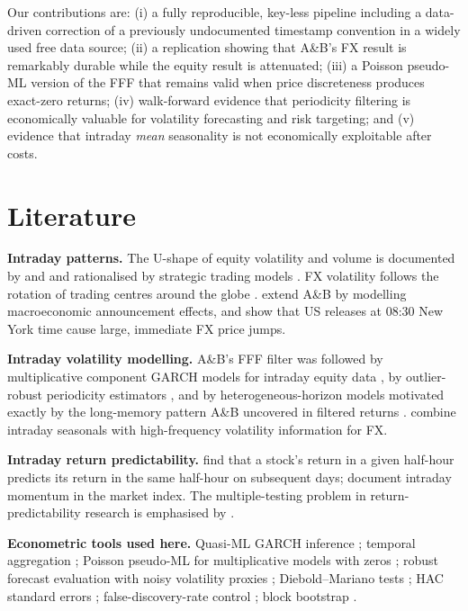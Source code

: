 \documentclass[11pt,a4paper]{article}
\begin{document}
Our contributions are: (i) a fully reproducible, key-less pipeline including a data-driven correction of a previously undocumented timestamp convention in a widely used free data source; (ii) a replication showing that A\&B's FX result is remarkably durable while the equity result is attenuated; (iii) a Poisson pseudo-ML version of the FFF that remains valid when price discreteness produces exact-zero returns; (iv) walk-forward evidence that periodicity filtering is economically valuable for volatility forecasting and risk targeting; and (v) evidence that intraday \emph{mean} seasonality is not economically exploitable after costs.

\section{Literature}
\label{sec:lit}
\textbf{Intraday patterns.} The U-shape of equity volatility and volume is documented by \citet{Wood1985} and \citet{Harris1986} and rationalised by strategic trading models \citep{AdmatiPfleiderer1988}. FX volatility follows the rotation of trading centres around the globe \citep{Dacorogna1993}. \citet{AB1998} extend A\&B by modelling macroeconomic announcement effects, and \citet{Andersen2003} show that US releases at 08:30 New York time cause large, immediate FX price jumps.

\textbf{Intraday volatility modelling.} A\&B's FFF filter was followed by multiplicative component GARCH models for intraday equity data \citep{Engle2012}, by outlier-robust periodicity estimators \citep{Boudt2011}, and by heterogeneous-horizon models motivated exactly by the long-memory pattern A\&B uncovered in filtered returns \citep{Muller1997,Corsi2009}. \citet{TaylorXu1997} combine intraday seasonals with high-frequency volatility information for FX.

\textbf{Intraday return predictability.} \citet{Heston2010} find that a stock's return in a given half-hour predicts its return in the same half-hour on subsequent days; \citet{Gao2018} document intraday momentum in the market index. The multiple-testing problem in return-predictability research is emphasised by \citet{HarveyLiuZhu2016}.

\textbf{Econometric tools used here.} Quasi-ML GARCH inference \citep{Bollerslev1986,BollerslevWooldridge1992}; temporal aggregation \citep{DrostNijman1993}; Poisson pseudo-ML for multiplicative models with zeros \citep{SantosSilva2006}; robust forecast evaluation with noisy volatility proxies \citep{Patton2011}; Diebold--Mariano tests \citep{DieboldMariano1995}; HAC standard errors \citep{NeweyWest1987}; false-discovery-rate control \citep{BenjaminiHochberg1995}; block bootstrap \citep{Kunsch1989}.
\end{document}
